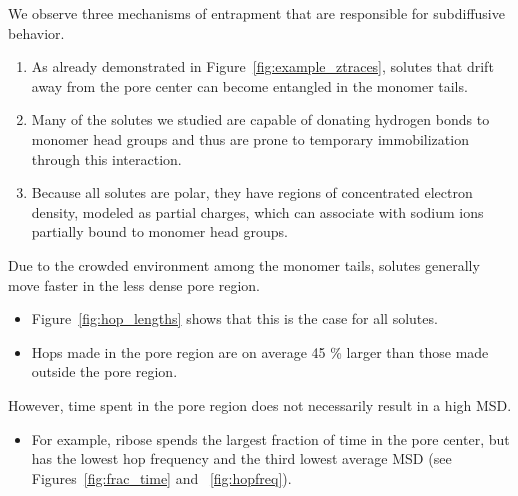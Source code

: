 \documentclass{article}
\begin{document}
  \noindent We observe three mechanisms of entrapment that are responsible for 
  subdiffusive behavior.
  \begin{enumerate}
    \item As already demonstrated in Figure~\ref{fig:example_ztraces}, solutes that
    drift away from the pore center can become entangled in the monomer tails. 
    \item Many of the solutes we studied are capable of donating hydrogen bonds to
    monomer head groups and thus are prone to temporary immobilization through this interaction.
    \item Because all solutes are polar, they have regions of concentrated electron
    density, modeled as partial charges, which can associate with sodium ions
    partially bound to monomer head groups.
  \end{enumerate}
  
  Due to the crowded environment among the monomer tails, solutes generally move faster
  in the less dense pore region.
  \begin{itemize}
    \item Figure~\ref{fig:hop_lengths} shows that this is the case for all solutes.
    \item Hops made in the pore region are on average 45 \% larger than those made
    outside the pore region.
  \end{itemize}
  
  However, time spent in the pore region does not necessarily result
  in a high MSD. 
  \begin{itemize}
    \item For example, ribose spends the largest fraction of time in 
    the pore center, but has the lowest hop frequency and the third 
    lowest average MSD (see Figures~\ref{fig:frac_time} and ~\ref{fig:hopfreq}).
  \end{itemize}
  
\end{document}
